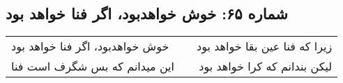 \begin{center}
\section*{شماره ۶۵: خوش خواهدبود، اگر فنا خواهد بود}
\label{sec:065}
\begin{longtable}{l p{0.5cm} r}
خوش خواهدبود، اگر فنا خواهد بود
&&
زیرا که فنا عین بقا خواهد بود
\\
این میدانم که بس شگرف است فنا
&&
لیکن بندانم که کرا خواهد بود
\\
\end{longtable}
\end{center}
